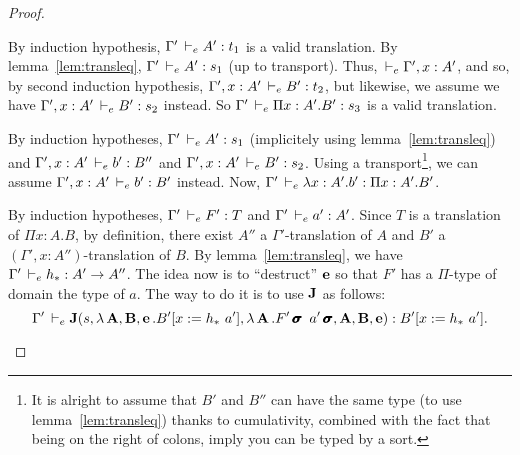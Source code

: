 \documentclass[a4paper,english]{lipics-utf8x}
\begin{document}
\begin{proof}
\begin{caselist}
      \begin{graycase}
        \begin{mathc}
        \end{mathc}
        By induction hypothesis, $\Gamma' \,\vdash_e A' : t_1$ is a valid
        translation.
        By lemma~\ref{lem:transleq}, $\Gamma' \,\vdash_e A' : s_1$ (up to transport).
        Thus, $\,\vdash_e \Gamma', x : A'$, and so, by second induction hypothesis,
        $\Gamma', x:A' \,\vdash_e B' : t_2$, but likewise, we assume we have
        $\Gamma', x:A' \,\vdash_e B' : s_2$ instead.
        So $\Gamma' \,\vdash_e \Pi x:A'.B' : s_3$ is a valid translation.
      \end{graycase}

      \begin{graycase}
        \begin{mathc}
        \end{mathc}
        By induction hypotheses, $\Gamma' \,\vdash_e A' : s_1$ (implicitely using
        lemma~\ref{lem:transleq}) and $\Gamma', x:A' \,\vdash_e b' : B''$ and
        $\Gamma', x:A' \,\vdash_e B' : s_2$.
        Using a transport\footnote{It is alright to assume that $B'$ and $B''$
        can have the same type (to use lemma~\ref{lem:transleq})
        thanks to cumulativity, combined with the fact that being on the right
        of colons, imply you can be typed by a sort.},
        we can assume $\Gamma', x:A' \,\vdash_e b' : B'$ instead.
        Now, $\Gamma' \,\vdash_e \lambda x:A'.b' : \Pi x:A'.B'$.
      \end{graycase}

      \nextcase
      \begin{mathc}
      \end{mathc}
      By induction hypotheses, $\Gamma' \,\vdash_e F' : T$ and
      $\Gamma' \,\vdash_e a' : A'$.
      Since $T$ is a translation of $\Pi x:A.B$, by definition, there exist
      $A''$ a $\Gamma'$-translation of $A$ and
      $B'$ a $(\Gamma', x:A'')$-translation of $B$.
      By lemma~\ref{lem:transleq}, we have $\Gamma' \,\vdash_e h_* : A' \to A''$.
      The idea now is to ``destruct'' $\operatorname{\mathbf{e}}$ so that $F'$ has a $\Pi$-type
      of domain the type of $a$. The way to do it is to use $\operatorname{\mathbf{J}}$ as follows:
      \[
        \Gamma' \,\vdash_e \operatorname{\mathbf{J}}(s,\lambda \operatorname{\mathbf{A}},\operatorname{\mathbf{B}},\operatorname{\mathbf{e}}. B'[x := h_*\ a'],
                         \lambda \operatorname{\mathbf{A}}. F'\operatorname{\pmb{\bm{\sigma}}}\ a'\operatorname{\pmb{\bm{\sigma}}}, \operatorname{\mathbf{A}}, \operatorname{\mathbf{B}}, \operatorname{\mathbf{e}}) :
                      B'[x := h_*\ a'].
      \]


\end{caselist}
\end{proof}
\end{document}
